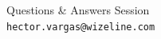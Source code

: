 \begin{frame}
    \centering
    \vspace{0.4cm}
    \begin{center}
        \small 
        Questions \& Answers Session \\
        \vspace{0.2cm}
        \footnotesize \texttt{hector.vargas@wizeline.com}
    \end{center}
\end{frame}
